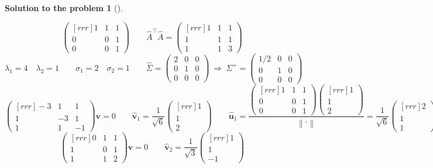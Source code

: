 \documentclass[12pt,a4]{article}
\newtheorem{solution}{Solution to the problem}
\newcommand{\bu}{{\mathbf u}}
\newcommand{\bv}{{\mathbf v}}
\newcommand{\norm}[1]{\left\lVert#1\right\rVert}
\begin{document}
\begin{solution}[]
\begin{enumerate}[(a)]
\[\begin{pmatrix}[rrr]
1 & 1 & 1 \\
0 & 0 & 1 \\
0 & 0 & 1
\end{pmatrix}
\qquad
\hat A^\top \hat A =
\begin{pmatrix}[rrr]
1 & 1 & 1 \\
1 & 1 & 1 \\
1 & 1 & 3
\end{pmatrix}
\]
\[
\lambda_1 = 4
\quad
\lambda_2 = 1
\qquad
\sigma_1 = 2
\quad
\sigma_2 = 1
\qquad
\hat \Sigma = \begin{pmatrix}
2 & 0 & 0 \\
0 & 1 & 0 \\
0 & 0 & 0
\end{pmatrix}
~\Rightarrow~
\Sigma^+ = \begin{pmatrix}
1/2 & 0 & 0 \\
0 & 1 & 0 \\
0 & 0 & 0
\end{pmatrix}
\]
\[
\begin{pmatrix}[rrr]
-3 & 1 & 1 \\
1 & -3 & 1 \\
1 & 1 & -1
\end{pmatrix}\bv = 0
\qquad
\hat \bv_1 = \frac1{\sqrt6}
\begin{pmatrix}[rrr] 
1 \\ 1 \\ 2
\end{pmatrix}
\qquad
\hat \bu_1 = \frac{
\begin{pmatrix}[rrr]
1 & 1 & 1 \\
0 & 0 & 1 \\
0 & 0 & 1
\end{pmatrix}
\begin{pmatrix}[rrr] 
1 \\ 1 \\ 2
\end{pmatrix}}{\norm{\cdot}}
= \frac1{\sqrt6}
\begin{pmatrix}[rrr] 
2 \\ 1 \\ 1
\end{pmatrix}
\]
\[
\begin{pmatrix}[rrr]
0 & 1 & 1 \\
1 & 0 & 1 \\
1 & 1 & 2
\end{pmatrix}\bv = 0
\qquad
\hat \bv_2 = \frac1{\sqrt3}
\begin{pmatrix}[rrr] 
1 \\ 1 \\ -1

\end{pmatrix}\]
\end{enumerate}
\end{solution}
\end{document}
